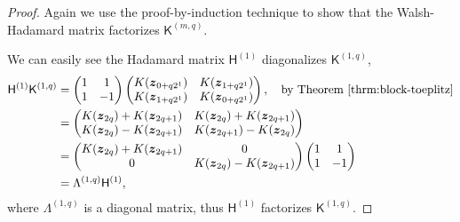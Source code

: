 \documentclass{iitthesis}          %
\newcommand{\bm}[1]{\boldsymbol{#1}}
\newcommand{\vz}{\bm{z}}
\newcommand{\mC}{\mathsf{C}}
\newcommand{\mH}{\mathsf{H}}
\newcommand{\mK}{\mathsf{K}}
\begin{document}
\begin{proof}
	
Again we use the proof-by-induction technique to show that the Walsh-Hadamard matrix factorizes $\mK^{(m,q)}$.

We can easily see the Hadamard matrix $\mH^{(1)}$ diagonalizes $\mK^{(1,q)}$,
\begin{align*}
\mH^{(1)} \mK^{(1,q)} &= 
\begin{pmatrix}
1 &  1 \\ 1 & -1
\end{pmatrix}
\begin{pmatrix}
K(\vz_{0 + q2^1}) & K(\vz_{1 + q2^1}) \\ K(\vz_{1 + q2^1}) & K(\vz_{0 + q2^1})
\end{pmatrix}, \quad \text{by Theorem \ref{thrm:block-toeplitz}} 
\\
& = \begin{pmatrix} K(\vz_{2q})+K(\vz_{2q+1}) & K(\vz_{2q})+K(\vz_{2q+1}) \\ K(\vz_{2q})-K(\vz_{2q+1}) & K(\vz_{2q+1})-K(\vz_{2q}) \end{pmatrix} \\ 
& = \begin{pmatrix} K(\vz_{2q})+K(\vz_{2q+1}) & 0 \\ 0 & K(\vz_{2q})-K(\vz_{2q+1}) \end{pmatrix} 
\begin{pmatrix}
1 &  1 \\ 1 & -1
\end{pmatrix} \\
&= \Lambda^{(1,q)} \mH^{(1)},
\end{align*}
where $\Lambda^{(1,q)}$ is a diagonal matrix, thus $\mH^{(1)}$ factorizes $\mK^{(1,q)}$.


\end{proof}
\end{document}
